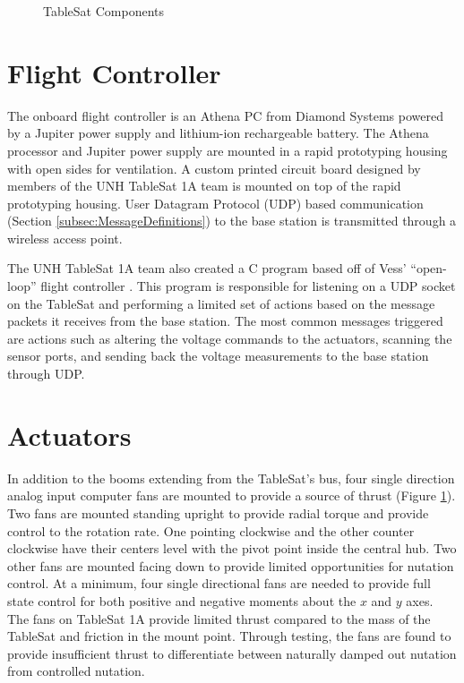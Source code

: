\begin{figure}[H]
\centerline{}
\caption{TableSat Components}
\label{fig:TSatComponents}
\end{figure}

\section{Flight Controller}
\label{sec:FlightController}

The onboard flight controller is an Athena PC from Diamond Systems powered by a Jupiter power supply and lithium-ion rechargeable battery.  The Athena processor and Jupiter power supply are mounted in a rapid prototyping housing with open sides for ventilation.  A custom printed circuit board designed by members of the UNH TableSat 1A team is mounted on top of the rapid prototyping housing.  User Datagram Protocol (UDP) based communication (Section \ref{subsec:MessageDefinitions}) to the base station is transmitted through a wireless access point.

The UNH TableSat 1A team also created a C program based off of Vess' ``open-loop'' flight controller \cite{vessthesis} .  This program is responsible for listening on a UDP socket on the TableSat and performing a limited set of actions based on the message packets it receives from the base station.  The most common messages triggered are actions such as altering the voltage commands to the actuators, scanning the sensor ports, and sending back the voltage measurements to the base station through UDP.

\section{Actuators}
\label{sec:Actuators}

In addition to the booms extending from the TableSat's bus, four single direction analog input computer fans are mounted to provide a source of thrust (Figure \ref{fig:TSatComponents}).  Two fans are mounted standing upright to provide radial torque and provide control to the rotation rate.  One pointing clockwise and the other counter clockwise have their centers level with the pivot point inside the central hub.  Two other fans are mounted facing down to provide limited opportunities for nutation control.  At a minimum, four single directional fans are needed to provide full state control for both positive and negative moments about the $x$ and $y$ axes.  The fans on TableSat 1A provide limited thrust compared to the mass of the TableSat and friction in the mount point.  Through testing, the fans are found to provide insufficient thrust to differentiate between naturally damped out nutation from controlled nutation.

